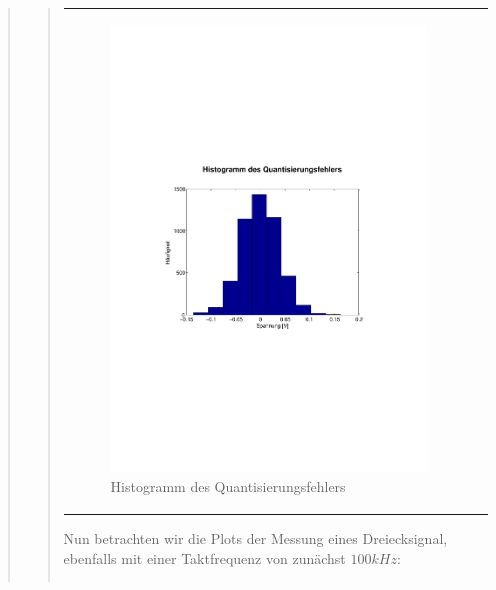 \begin{quote}
\begin{quote}
\begin{center}
\begin{tabular}{ll}
                \begin{minipage}{0.6\textwidth}
                    \begin{figure}[H]
                        \includegraphics[scale=0.55, trim = 1.6cm 9cm 1.6cm
                        8.5cm, clip]
                        {./Bilder/sin100_Histogramm}
                          \caption{Histogramm des Quantisierungsfehlers}
                    \end{figure}
                \end{minipage}
            
            \end{tabular}
        \end{center}
        
        
        Nun betrachten wir die Plots der Messung eines Dreiecksignal, ebenfalls
        mit einer Taktfrequenz von zunächst $100 kHz$:
        \begin{center}
            \begin{tabular}{ll}
            

\end{tabular}
\end{center}
\end{quote}
\end{quote}
